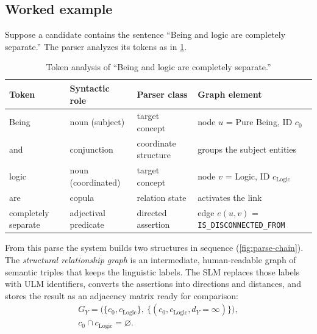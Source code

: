 \documentclass[twocolumn]{ulpaper}
\newcommand{\rel}[1]{\texttt{\small #1}}
\begin{document}
\subsection{Worked example}
\label{sec:worked}

Suppose a candidate contains the sentence ``Being and logic are completely separate.'' The parser analyzes its tokens as in \cref{tab:tokens}.

\begin{table}[t]
\centering
\caption{Token analysis of ``Being and logic are completely separate.''}
\label{tab:tokens}
\small
\begin{tabular}{@{}llll@{}}
\toprule
\textbf{Token} & \textbf{Syntactic role} & \textbf{Parser class} & \textbf{Graph element} \\
\midrule
Being & noun (subject) & target concept & node $u$ = Pure Being, ID $c_0$ \\
and & conjunction & coordinate structure & groups the subject entities \\
logic & noun (coordinated) & target concept & node $v$ = Logic, ID $c_{\text{Logic}}$ \\
are & copula & relation state & activates the link \\
completely separate & adjectival predicate & directed assertion & edge $e(u,v)$ = \rel{IS\_DISCONNECTED\_FROM} \\
\bottomrule
\end{tabular}
\end{table}

From this parse the system builds two structures in sequence (\cref{fig:parse-chain}). The \emph{structural relationship graph} is an intermediate, human-readable graph of semantic triples that keeps the linguistic labels. The SLM replaces those labels with ULM identifiers, converts the assertions into directions and distances, and stores the result as an adjacency matrix ready for comparison:
\begin{equation}
\begin{gathered}
G_Y = \bigl(\{c_0, c_{\text{Logic}}\},\ \{(c_0, c_{\text{Logic}}, d_Y = \infty)\}\bigr), \\
c_0 \cap c_{\text{Logic}} = \varnothing .
\end{gathered}
\end{equation}
\end{document}
